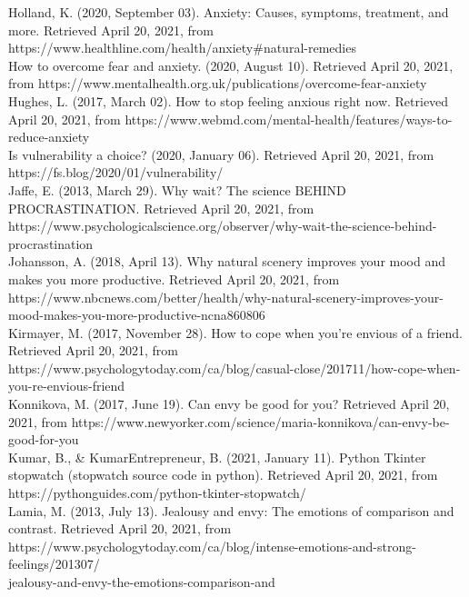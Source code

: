 \documentclass{article}
\begin{document}
    Holland, K. (2020, September 03). Anxiety: Causes, symptoms, treatment, and more. Retrieved April 20, 2021, from https://www.healthline.com/health/anxiety#natural-remedies \\

    How to overcome fear and anxiety. (2020, August 10). Retrieved April 20, 2021, from https://www.mentalhealth.org.uk/publications/overcome-fear-anxiety \\

    Hughes, L. (2017, March 02). How to stop feeling anxious right now. Retrieved April 20, 2021, from https://www.webmd.com/mental-health/features/ways-to-reduce-anxiety \\

    Is vulnerability a choice? (2020, January 06). Retrieved April 20, 2021, from https://fs.blog/2020/01/vulnerability/ \\

    Jaffe, E. (2013, March 29). Why wait? The science BEHIND PROCRASTINATION. Retrieved April 20, 2021, from https://www.psychologicalscience.org/observer/why-wait-the-science-behind-procrastination \\

    Johansson, A. (2018, April 13). Why natural scenery improves your mood and makes you more productive. Retrieved April 20, 2021, from\\ https://www.nbcnews.com/better/health/why-natural-scenery-improves-your-mood-makes-you-more-productive-ncna860806 \\

    Kirmayer, M. (2017, November 28). How to cope when you're envious of a friend. Retrieved April 20, 2021, from https://www.psychologytoday.com/ca/blog/casual-close/201711/how-cope-when-you-re-envious-friend \\

    Konnikova, M. (2017, June 19). Can envy be good for you? Retrieved April 20, 2021, from https://www.newyorker.com/science/maria-konnikova/can-envy-be-good-for-you \\

    Kumar, B., & KumarEntrepreneur, B. (2021, January 11). Python Tkinter stopwatch (stopwatch source code in python). Retrieved April 20, 2021, from https://pythonguides.com/python-tkinter-stopwatch/ \\

    Lamia, M. (2013, July 13). Jealousy and envy: The emotions of comparison and contrast. Retrieved April 20, 2021, from \\https://www.psychologytoday.com/ca/blog/intense-emotions-and-strong-feelings/201307/ \\jealousy-and-envy-the-emotions-comparison-and \\
\end{document}
